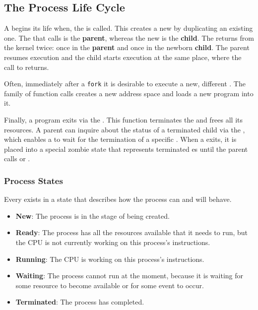 \subsection{The Process Life Cycle}\label{subsec:Process_Life_Cycle}
A  begins its life when, the   is called.
This creates a new  by duplicating an existing one.
The  that calls  is the \textbf{parent}, whereas the new  is the \textbf{child}.
The   returns from the kernel twice: once in the \textbf{parent} and once in the newborn \textbf{child}.
The parent resumes execution and the child starts execution at the same place, where the call to  returns.

Often, immediately after a \texttt{fork} it is desirable to execute a new, different .
The  family of function calls creates a new address space and loads a new program into it.

Finally, a program exits via the  .
This function terminates the  and frees all its resources.
A parent  can inquire about the status of a terminated child via the  , which enables a  to wait for the termination of a specific .
When a  exits, it is placed into a special zombie state that represents terminated es until the parent calls  or .

\subsubsection{Process States}\label{subsubsec:Process_States}
Every  exists in a state that describes how the process can and will behave.
\begin{itemize}[noitemsep]
\item \textbf{New}: The process is in the stage of being created.
\item \textbf{Ready}: The process has all the resources available that it needs to run, but the CPU is not currently working on this process's instructions.
\item \textbf{Running}: The CPU is working on this process's instructions.
\item \textbf{Waiting}: The process cannot run at the moment, because it is waiting for some resource to become available or for some event to occur.
\item \textbf{Terminated}: The process has completed.
\end{itemize}

